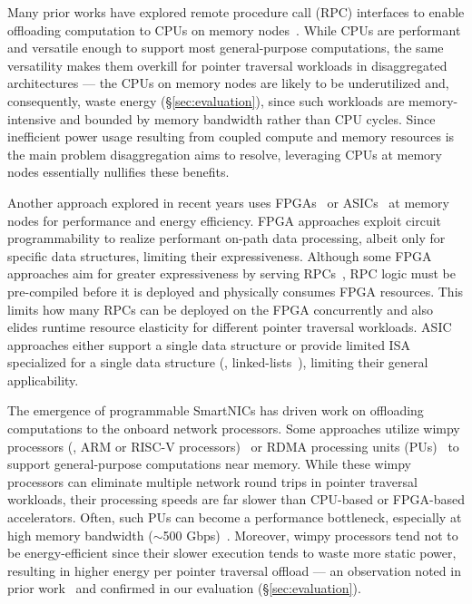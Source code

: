  Many prior works have explored remote procedure call (RPC) interfaces to enable offloading computation to CPUs on memory nodes~\cite{aifm, kayak_nsdi_21, splinter, storagefunctions, storm_systor_19}. While CPUs are performant and versatile enough to support most general-purpose computations, the same versatility makes them overkill for pointer traversal workloads in disaggregated architectures --- the CPUs on memory nodes are likely to be underutilized and, consequently, waste energy (\S\ref{sec:evaluation}), since such workloads are memory-intensive and bounded by memory bandwidth rather than CPU cycles. 
Since inefficient power usage resulting from coupled compute and memory resources is the main problem disaggregation aims to resolve, leveraging CPUs at memory nodes essentially nullifies these benefits. 

 Another approach explored in recent years uses FPGAs~\cite{clio,strom} or ASICs~\cite{impica, walkers} at memory nodes for performance and energy efficiency. FPGA approaches exploit circuit programmability to realize performant on-path data processing, albeit only for specific data structures, limiting their expressiveness. Although some FPGA approaches aim for greater expressiveness by serving RPCs~\cite{coyote}, RPC logic must be pre-compiled before it is deployed and physically consumes FPGA resources. This limits how many RPCs can be deployed on the FPGA concurrently and also elides runtime resource elasticity for different pointer traversal workloads. ASIC approaches either support a single data structure or provide limited ISA specialized for a single data structure (\eg, linked-lists~\cite{walkers}), limiting their general applicability. 

 The emergence of programmable SmartNICs has driven work on offloading computations to the onboard network processors. Some approaches utilize wimpy processors (\eg, ARM or RISC-V processors)~\cite{rmc_hotnets20} or RDMA processing units (PUs)~\cite{redn} to support general-purpose computations near memory. While these wimpy processors can eliminate multiple network round trips in pointer traversal workloads, their processing speeds are far slower than CPU-based or FPGA-based accelerators. Often, such PUs can become a performance bottleneck, especially at high memory bandwidth ($\sim$500 Gbps)~\cite{redn, disagg}. Moreover, wimpy processors tend not to be energy-efficient since their slower execution tends to waste more static power, resulting in higher energy per pointer traversal offload --- an observation noted in prior work~\cite{clio} and confirmed in our evaluation (\S\ref{sec:evaluation}). 


